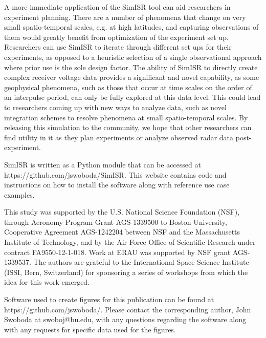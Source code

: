 \documentclass[draft,ras]{agutex}
\begin{document}
\begin{article}
A more immediate application of the SimISR tool can aid researchers in experiment planning. There are a number of phenomena that change on very small spatio-temporal scales, e.g. at high latitudes, and capturing observations of them would greatly benefit from optimization of the experiment set up. Researchers can use SimISR to iterate through different set ups for their experiments, as opposed to a heuristic selection of a single observational approach where prior use is the sole design factor. The ability of SimISR to directly create complex receiver voltage data provides a significant and novel capability, as some geophysical phenomena, such as those that occur at time scales on the order of an interpulse period, can only be fully explored at this data level. This could lead to researchers coming up with new ways to analyze data, such as novel integration schemes to resolve phenomena at small spatio-temporal scales.
By releasing this simulation to the community, we hope that other researchers can find utility in it as they plan experiments or analyze observed radar data post-experiment.

SimISR is written as a Python module that can be accessed at https://github.com/jswoboda/SimISR. This website contains code and instructions on how to install the software along with reference use case examples.
\begin{acknowledgments}
This study was supported by the U.S. National Science Foundation (NSF), through Aeronomy Program Grant AGS-1339500 to Boston University, Cooperative Agreement AGS-1242204 between NSF and the Massachusetts Institute of Technology, and by the Air Force Office of Scientific Research under contract FA9550-12-1-018.   Work at ERAU was supported by NSF grant AGS-1339537.  The authors are grateful to the International Space Science Institute (ISSI, Bern, Switzerland) for sponsoring a series of workshops from which the idea for this work emerged. 

Software used to create figures for this publication can be found at https://github.com/jswoboda/. Please contact the corresponding author, John Swoboda at swoboj@bu.edu, with any questions regarding the software along with any requests for specific data used for the figures. \end{acknowledgments}




\end{article}
\end{document}
